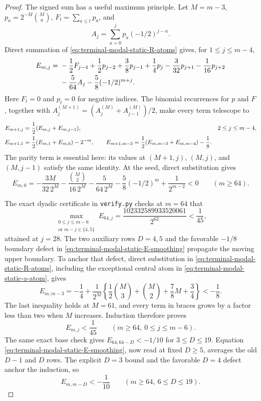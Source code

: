 \begin{proof}
The signed sum has a useful maximum principle.  Let $M=m-3$,
$p_a=2^{-M}\binom Ma$, $F_t=\sum_{a\le t}p_a$, and
\[
 A_j=\sum_{a=0}^jp_a(-1/2)^{j-a}.
\]
Direct summation of \eqref{eq:terminal-modal-static-R-atoms} gives, for
$1\le j\le m-4$,
\begin{align}
 E_{m,j}={}&-\frac12F_{j-4}
 +\frac12p_{j-2}+\frac38p_{j-1}+\frac14p_j
 -\frac3{32}p_{j+1}-\frac1{16}p_{j+2}\notag\\
 &-\frac5{64}A_j-\frac58(-1/2)^{m+j}.
 \label{eq:terminal-modal-static-E-binomial}
\end{align}
Here $F_t=0$ and $p_t=0$ for negative indices.  The binomial recurrences for
$p$ and $F$, together with
$A_j^{(M+1)}=(A_j^{(M)}+A_{j-1}^{(M)})/2$, make every term telescope to
\begin{align}
 E_{m+1,j}&=\frac12(E_{m,j}+E_{m,j-1}),
 &&2\le j\le m-4,\notag\\
 E_{m+1,1}&=\frac12(E_{m,1}+E_{m,0})-2^{-m},\qquad
 E_{m+1,m-3}
 =\frac12(E_{m,m-3}+E_{m,m-4})-\frac18.
 \label{eq:terminal-modal-static-E-smoothing}
\end{align}
The parity term is essential here: its values at $(M+1,j)$, $(M,j)$, and
$(M,j-1)$ satisfy the same identity.  At the seed, direct substitution gives
\[
 E_{m,0}
 =-\frac{3M}{32\,2^M}
  -\frac{\binom M2}{16\,2^M}
  -\frac5{64\,2^M}
  -\frac58(-1/2)^m+\frac1{2^{m-2}}<0
 \qquad(m\ge64).
\]

The exact dyadic certificate in \texttt{verify.py} checks at $m=64$ that
\begin{equation}
 \max_{\substack{0\le j\le m-6\\\text{or }m-j\in\{4,5\}}}E_{64,j}
 =\frac{102332589933520061}{2^{62}}<\frac1{45},
 \label{eq:terminal-modal-static-E-base}
\end{equation}
attained at $j=28$.  The two auxiliary rows $D=4,5$ and the favorable
$-1/8$ boundary defect in
\eqref{eq:terminal-modal-static-E-smoothing} propagate the moving upper
boundary.  To anchor that defect, direct substitution in
\eqref{eq:terminal-modal-static-R-atoms}, including the exceptional central
atom in \eqref{eq:terminal-modal-static-a-atom}, gives
\[
 E_{m,m-3}
 =-\frac14+\frac1{2^M}
 \left\{\frac12\binom M3+\binom M2+\frac78M+\frac34\right\}
 <-\frac18.
\]
The last inequality holds at $M=61$, and every term in braces grows by a
factor less than two when $M$ increases.  Induction therefore proves
\begin{equation}
 E_{m,j}<\frac1{45}
 \qquad(m\ge64,\ 0\le j\le m-6).
 \label{eq:terminal-modal-static-E-uniform}
\end{equation}
The same exact base check gives $E_{64,64-D}<-1/10$ for $3\le D\le19$.
Equation \eqref{eq:terminal-modal-static-E-smoothing}, now read at fixed
$D\ge5$, averages the old $D-1$ and $D$ rows.  The explicit $D=3$ bound and
the favorable $D=4$ defect anchor the induction, so
\begin{equation}
 E_{m,m-D}<-\frac1{10}
 \qquad(m\ge64,\ 6\le D\le19).
 \label{eq:terminal-modal-static-E-frontier}
\end{equation}


\end{proof}

